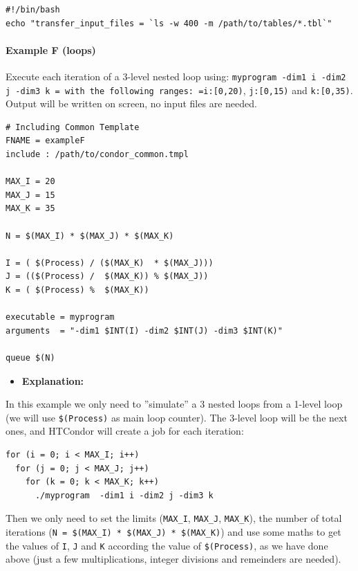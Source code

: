 \documentclass[a4paper,10pt]{article}
\begin{document}
\begin{verbatim}
#!/bin/bash
echo "transfer_input_files = `ls -w 400 -m /path/to/tables/*.tbl`"
\end{verbatim}

\paragraph{Example F (loops)}
\label{sec:org552e0c8}

Execute each iteration of a 3-level nested loop using: \texttt{myprogram -dim1 i -dim2
j -dim3 k = with the following ranges: =i:[0,20)}, \texttt{j:[0,15)} and
\texttt{k:[0,35)}. Output will be written on screen, no input files are needed.

\begin{verbatim}
# Including Common Template
FNAME = exampleF
include : /path/to/condor_common.tmpl
 
MAX_I = 20
MAX_J = 15
MAX_K = 35

N = $(MAX_I) * $(MAX_J) * $(MAX_K)

I = ( $(Process) / ($(MAX_K)  * $(MAX_J)))
J = (($(Process) /  $(MAX_K)) % $(MAX_J))
K = ( $(Process) %  $(MAX_K))

executable = myprogram
arguments  = "-dim1 $INT(I) -dim2 $INT(J) -dim3 $INT(K)"

queue $(N) 
\end{verbatim}

\begin{itemize}
\item \textbf{Explanation:}
\end{itemize}

In this example we only need to ''simulate'' a 3 nested loops from a 1-level
loop (we will use \texttt{\$(Process)} as main loop counter). The 3-level loop will be
the next ones, and HTCondor will create a job for each iteration:

\begin{verbatim}
for (i = 0; i < MAX_I; i++)
  for (j = 0; j < MAX_J; j++)
    for (k = 0; k < MAX_K; k++)
      ./myprogram  -dim1 i -dim2 j -dim3 k
\end{verbatim}

Then we only need to set the limits (\texttt{MAX\_I}, \texttt{MAX\_J}, \texttt{MAX\_K}), the number of
total iterations (\texttt{N = \$(MAX\_I) * \$(MAX\_J) * \$(MAX\_K)}) and use some maths to
get the values of \texttt{I}, \texttt{J} and \texttt{K} according the value of \texttt{\$(Process)}, as we
have done above (just a few multiplications, integer divisions and remeinders
are needed). 
\end{document}
